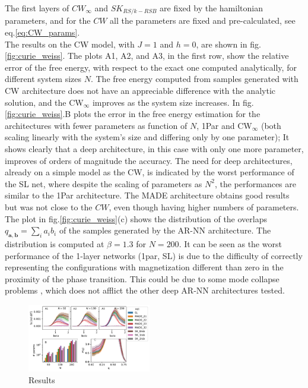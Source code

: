 \documentclass[aps,physrev,10pt,floatfix,reprint]{revtex4-2}
\begin{document}
The first layers of $CW_{\infty}$ and $SK_{RS/k-RSB}$ are fixed by the hamiltonian parameters, and for the $CW$ all the parameters are fixed and pre-calculated, see eq.\ref{eq:CW_params}.\\
The results on the CW model, with $J=1$ and $h=0$, are shown in fig.\ref{fig:curie_weiss}. 
The plots A1, A2, and A3, in the first row, show the relative error of the free energy, with respect to the exact one computed analytically, for different system sizes $N$. 
The free energy computed from samples generated with CW architecture does not have an appreciable difference with the analytic solution, and the CW$_{\infty}$ improves as the system size increases. In fig.\ref{fig:curie_weiss}.B plots the error in the free energy estimation for the architectures with fewer parameters as function of $N$, 1Par and CW$_{\infty}$ (both scaling linearly with the system's size and differing only by one parameter); It shows clearly that a deep architecture, in this case with only one more parameter, improves of orders of magnitude the accuracy. The need for deep architectures, already on a simple model as the CW, is indicated by the worst performance of the SL net, where despite the scaling of parameters as $N^2$, the performances are similar to the 1Par architecture. The MADE architecture obtains good results but was not close to the $CW$, even though having higher numbers of parameters. The plot in fig.\ref{fig:curie_weiss}(c) shows the distribution of the overlaps $q_{\mathbf{a}, \mathbf{b}}=\sum_{i} a_i b_i$ of the samples generated by the AR-NN architecture. The distribution is computed at $\beta=1.3$ for $N=200$. It can be seen as the worst performance of the 1-layer networks (1par, SL) is due to the difficulty of correctly representing the configurations with magnetization different than zero in the proximity of the phase transition. This could be due to some mode collapse problems \cite{https://doi.org/10.48550/arxiv.2210.11145}, which does not afflict the other deep AR-NN architectures tested.

\begin{figure}[]
    \centering 
    \includegraphics[width=0.48\textwidth]{img/SK_res.pdf}
    \caption{Results}
    \label{fig:SK}
\end{figure}
\end{document}
